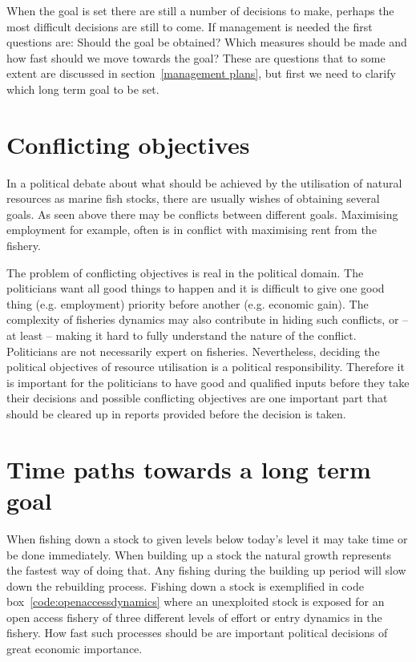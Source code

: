 \documentclass[11pt,fleqn]{book} %
\begin{document}
When the goal is set there are still a number of decisions to make, perhaps the most difficult decisions are still to come. If management is needed the first questions are: Should the goal be obtained? Which measures should be made and how fast should we move towards the goal? These are questions that to some extent are discussed in section~\ref{management plans}, but first we need to clarify which long term goal to be set.

\section{Conflicting objectives} 

In a political debate about what should be achieved by the utilisation of natural resources as marine fish stocks, there are usually wishes of obtaining several goals. As seen above there may be conflicts between different goals. Maximising employment for example, often is in conflict with maximising rent from the fishery.

The problem of conflicting objectives is real in the political domain. The politicians want all good things to happen and it is difficult to give one good thing (e.g. employment) priority before another (e.g. economic gain). The complexity of fisheries dynamics may also contribute in hiding such conflicts, or -- at least -- making it hard to fully understand the nature of the conflict. Politicians are not necessarily expert on fisheries. Nevertheless, deciding the political objectives of resource utilisation is a political responsibility. Therefore it is important for the politicians to have good and qualified inputs before they take their decisions and possible conflicting objectives are one important part that should be cleared up in reports provided before the decision is taken.

\section{Time paths towards a long term goal} \label{management plans}
When fishing down a stock to given levels below today's level it may take time or be done immediately. When building up a stock the natural growth represents the fastest way of doing that. Any fishing during the building up period will slow down the rebuilding process. Fishing down a stock is exemplified in code box~\ref{code:openaccessdynamics} where an unexploited stock is exposed for an open access fishery of three different levels of effort or entry dynamics in the fishery. How fast such processes should be are important political decisions of great economic importance.
\end{document}
